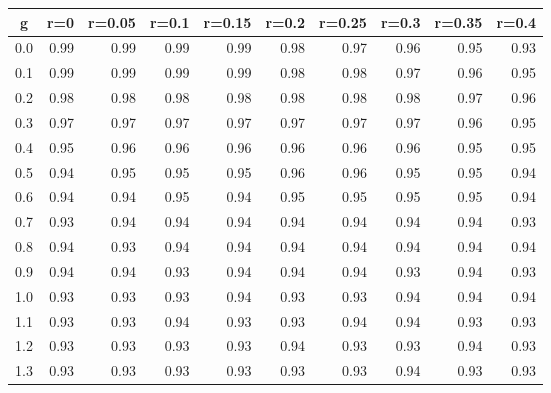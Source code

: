 %
\begin{table}[!tbp]
 \begin{center}
 \begin{tabular}{rrrrrrrrrr}\hline\hline
\multicolumn{1}{c}{g}&\multicolumn{1}{c}{r=0}&\multicolumn{1}{c}{r=0.05}&\multicolumn{1}{c}{r=0.1}&\multicolumn{1}{c}{r=0.15}&\multicolumn{1}{c}{r=0.2}&\multicolumn{1}{c}{r=0.25}&\multicolumn{1}{c}{r=0.3}&\multicolumn{1}{c}{r=0.35}&\multicolumn{1}{c}{r=0.4}\tabularnewline
\hline
0.0&0.99&0.99&0.99&0.99&0.98&0.97&0.96&0.95&0.93\tabularnewline
0.1&0.99&0.99&0.99&0.99&0.98&0.98&0.97&0.96&0.95\tabularnewline
0.2&0.98&0.98&0.98&0.98&0.98&0.98&0.98&0.97&0.96\tabularnewline
0.3&0.97&0.97&0.97&0.97&0.97&0.97&0.97&0.96&0.95\tabularnewline
0.4&0.95&0.96&0.96&0.96&0.96&0.96&0.96&0.95&0.95\tabularnewline
0.5&0.94&0.95&0.95&0.95&0.96&0.96&0.95&0.95&0.94\tabularnewline
0.6&0.94&0.94&0.95&0.94&0.95&0.95&0.95&0.95&0.94\tabularnewline
0.7&0.93&0.94&0.94&0.94&0.94&0.94&0.94&0.94&0.93\tabularnewline
0.8&0.94&0.93&0.94&0.94&0.94&0.94&0.94&0.94&0.94\tabularnewline
0.9&0.94&0.94&0.93&0.94&0.94&0.94&0.93&0.94&0.93\tabularnewline
1.0&0.93&0.93&0.93&0.94&0.93&0.93&0.94&0.94&0.94\tabularnewline
1.1&0.93&0.93&0.94&0.93&0.93&0.94&0.94&0.93&0.93\tabularnewline
1.2&0.93&0.93&0.93&0.93&0.94&0.93&0.93&0.94&0.93\tabularnewline
1.3&0.93&0.93&0.93&0.93&0.93&0.93&0.94&0.93&0.93\tabularnewline
\hline
\end{tabular}

\end{center}

\end{table}

